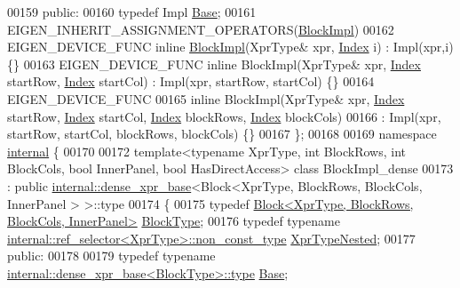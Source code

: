 \begin{DoxyCode}
00159   \textcolor{keyword}{public}:
00160     \textcolor{keyword}{typedef} Impl \hyperlink{class_eigen_1_1internal_1_1_block_impl__dense}{Base};
00161     EIGEN\_INHERIT\_ASSIGNMENT\_OPERATORS(\hyperlink{class_eigen_1_1_block_impl}{BlockImpl})
00162     EIGEN\_DEVICE\_FUNC \textcolor{keyword}{inline} \hyperlink{class_eigen_1_1_block_impl}{BlockImpl}(XprType& xpr, \hyperlink{namespace_eigen_a62e77e0933482dafde8fe197d9a2cfde}{Index} i) : Impl(xpr,i) \{\}
00163     EIGEN\_DEVICE\_FUNC \textcolor{keyword}{inline} BlockImpl(XprType& xpr, \hyperlink{namespace_eigen_a62e77e0933482dafde8fe197d9a2cfde}{Index} startRow, \hyperlink{namespace_eigen_a62e77e0933482dafde8fe197d9a2cfde}{Index} startCol) : Impl(xpr, 
      startRow, startCol) \{\}
00164     EIGEN\_DEVICE\_FUNC
00165     \textcolor{keyword}{inline} BlockImpl(XprType& xpr, \hyperlink{namespace_eigen_a62e77e0933482dafde8fe197d9a2cfde}{Index} startRow, \hyperlink{namespace_eigen_a62e77e0933482dafde8fe197d9a2cfde}{Index} startCol, 
      \hyperlink{namespace_eigen_a62e77e0933482dafde8fe197d9a2cfde}{Index} blockRows, \hyperlink{namespace_eigen_a62e77e0933482dafde8fe197d9a2cfde}{Index} blockCols)
00166       : Impl(xpr, startRow, startCol, blockRows, blockCols) \{\}
00167 \};
00168 
00169 \textcolor{keyword}{namespace }\hyperlink{namespaceinternal}{internal} \{
00170 
00172 \textcolor{keyword}{template}<\textcolor{keyword}{typename} XprType, \textcolor{keywordtype}{int} BlockRows, \textcolor{keywordtype}{int} BlockCols, \textcolor{keywordtype}{bool} InnerPanel, \textcolor{keywordtype}{bool} HasDirectAccess> \textcolor{keyword}{class }
      BlockImpl\_dense
00173   : \textcolor{keyword}{public} \hyperlink{struct_eigen_1_1internal_1_1dense__xpr__base}{internal::dense\_xpr\_base}<Block<XprType, BlockRows, BlockCols, InnerPanel
      > >::type
00174 \{
00175     \textcolor{keyword}{typedef} \hyperlink{group___core___module_class_eigen_1_1_block}{Block<XprType, BlockRows, BlockCols, InnerPanel>}
       \hyperlink{group___core___module_class_eigen_1_1_block}{BlockType};
00176     \textcolor{keyword}{typedef} \textcolor{keyword}{typename} \hyperlink{class_eigen_1_1internal_1_1_tensor_lazy_evaluator_writable}{internal::ref\_selector<XprType>::non\_const\_type}
       \hyperlink{class_eigen_1_1internal_1_1_tensor_lazy_evaluator_writable}{XprTypeNested};
00177   \textcolor{keyword}{public}:
00178 
00179     \textcolor{keyword}{typedef} \textcolor{keyword}{typename} \hyperlink{struct_eigen_1_1internal_1_1dense__xpr__base}{internal::dense\_xpr\_base<BlockType>::type} 
      \hyperlink{class_eigen_1_1internal_1_1_block_impl__dense}{Base};

\end{DoxyCode}
